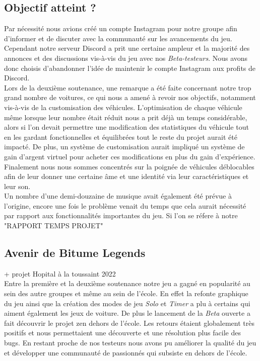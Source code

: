 \documentclass[a4paper,12pt]{article}
\begin{document}
        \subsection{Objectif atteint ?}
        Par nécessité nous avions créé un compte Instagram pour notre groupe afin d'informer et de discuter avec la communauté sur les avancements du jeu. Cependant notre serveur Discord a prit une certaine ampleur et la majorité des annonces et des discussions vis-à-vis du jeu avec nos \textsl{Beta-testeurs}. Nous avons donc choisis d'abandonner l'idée de maintenir le compte Instagram aux profits de Discord.\\
        Lors de la deuxième soutenance, une remarque a été faite concernant notre trop grand nombre de voitures, ce qui nous a amené à revoir nos objectifs, notamment vis-à-vis de la customisation des véhicules. L'optimisation de chaque véhicule même lorsque leur nombre était réduit nous a prit déjà un temps considérable, alors si l'on devait permettre une modification des statistiques du véhicule tout en les gardant fonctionnelles et équilibrées tout le reste du projet aurait été impacté. De plus, un système de customisation aurait impliqué un système de gain d'argent virtuel pour acheter ces modifications en plus du gain d'expérience. Finalement nous nous sommes concentrés sur la poignée de véhicules déblocables afin de leur donner une certaine âme et une identité via leur caractéristiques et leur son.\\
        Un nombre d'une demi-douzaine de musique avait également été prévue à l'origine, encore une fois le problème venait du temps que cela aurait nécessité par rapport aux fonctionnalités importantes du jeu.
        Si l'on se réfere à notre "RAPPORT TEMPS PROJET"
        \\\lipsum[36]
    \subsection{Avenir de Bitume Legends}
        + projet Hopital à la toussaint 2022\\
        Entre la première et la deuxième soutenance notre jeu a gagné en popularité au sein des autre groupes et même au sein de l'école. En effet la refonte graphique du jeu ainsi que la création des modes de jeu \textsl{Solo} et \textsl{Timer} a plu à certains qui aiment également les jeux de voiture. De plus le lancement de la \textsl{Beta} ouverte a fait découvrir le projet zen dehors de l'école. Les retours étaient globalement très positifs et nous permettaient une découverte et une résolution plus facile des bugs. En restant proche de nos testeurs nous avons pu améliorer la qualité du jeu et développer une communauté de passionnés qui subsiste en dehors de l'école.
        
\end{document}
